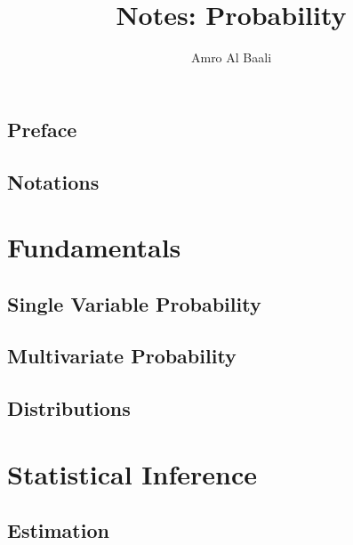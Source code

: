 \documentclass{Templates/amro-notes}
\title{Notes: Probability}
\author{{Amro Al Baali}}
\date{\daterange}
\begin{document}
\maketitle
\tableofcontents
{} 


\chapter*{Preface}


\clearpage
\chapter*{Notations}


\clearpage
{} 
\part{Fundamentals}
\chapter{Single Variable Probability}


\clearpage
\chapter{Multivariate Probability}


\clearpage
\chapter{Distributions}


\clearpage
\part{Statistical Inference}

% 

\chapter{Estimation}



\begin{appendices}
    
\end{appendices}


\end{document}
